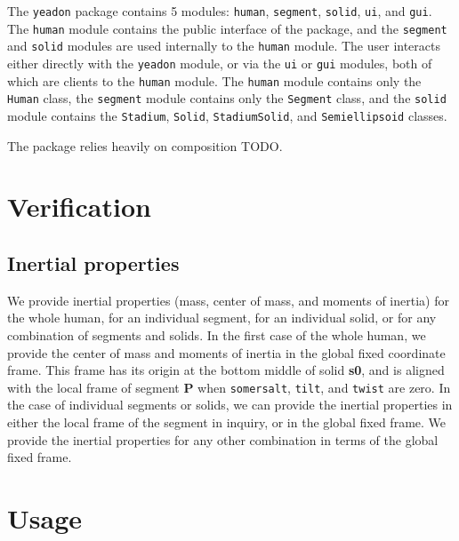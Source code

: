 \documentclass[10pt]{article}
\begin{document}
The \verb+yeadon+ package contains 5 modules: \verb+human+, \verb+segment+,
\verb+solid+, \verb+ui+, and \verb+gui+. The \verb+human+ module contains the
public interface of the package, and the \verb+segment+ and \verb+solid+
modules are used internally to the \verb+human+ module. The user interacts
either directly with the \verb+yeadon+ module, or via the \verb+ui+ or
\verb+gui+ modules, both of which are clients to the \verb+human+ module. The
\verb+human+ module contains only the \verb+Human+ class, the \verb+segment+
module contains only the \verb+Segment+ class, and the \verb+solid+ module
contains the \verb+Stadium+, \verb+Solid+, \verb+StadiumSolid+, and
\verb+Semiellipsoid+ classes.

The package relies heavily on composition TODO.


\section*{Verification}

\subsection*{Inertial properties}

We provide inertial properties (mass, center of mass, and moments of inertia)
for the whole human, for an individual segment, for an individual solid, or for
any combination of segments and solids. In the first case of the whole human,
 we provide the center of mass and moments of inertia in the global fixed coordinate frame. This frame has its
 origin at the bottom middle of solid \textbf{s0}, and is aligned with the
local frame of segment \textbf{P} when \verb+somersalt+, \verb+tilt+, and
\verb+twist+ are zero.
In the case of individual segments or solids, we can provide the inertial
properties in either the local frame of the segment in inquiry, or in the
global fixed frame. We provide the inertial properties for any other
combination in terms of the global fixed frame.





\section*{Usage}
\label{sec:usage}
\end{document}
